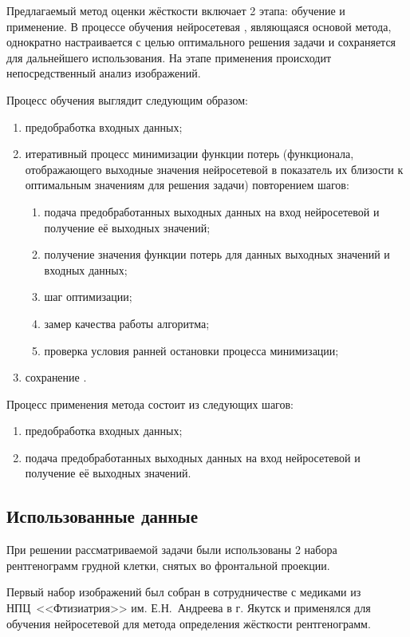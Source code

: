Предлагаемый метод оценки жёсткости включает 2 этапа: обучение и применение. В процессе обучения нейросетевая , являющаяся основой метода, однократно настраивается с целью оптимального решения задачи и сохраняется для дальнейшего использования. На этапе применения происходит непосредственный анализ изображений.

Процесс обучения выглядит следующим образом:
\begin{enumerate}[beginpenalty=10000]
	\item предобработка входных данных;
	\item итеративный процесс минимизации функции потерь (функционала, отображающего выходные значения нейросетевой  в показатель их близости к оптимальным значениям для решения задачи) повторением шагов:
	\begin{enumerate}[beginpenalty=10000]
		\item подача предобработанных выходных данных на вход нейросетевой  и получение её выходных значений;
		\item получение значения функции потерь для данных выходных значений  и входных данных;
		\item шаг оптимизации;
		\item замер качества работы алгоритма;
		\item проверка условия ранней остановки процесса минимизации;
	\end{enumerate}
	\item сохранение .	
\end{enumerate}

Процесс применения метода состоит из следующих шагов:
\begin{enumerate}[beginpenalty=10000]
	\item предобработка входных данных;
	\item подача предобработанных выходных данных на вход нейросетевой  и получение её выходных значений.
\end{enumerate}

\subsection{Использованные данные}

При решении рассматриваемой задачи были использованы 2 набора рентгенограмм грудной клетки, снятых во фронтальной проекции.

Первый набор изображений был собран в сотрудничестве с медиками из НПЦ~<<Фтизиатрия>> им. Е.Н.~Андреева в г. Якутск и применялся для обучения нейросетевой  для метода определения жёсткости рентгенограмм.

